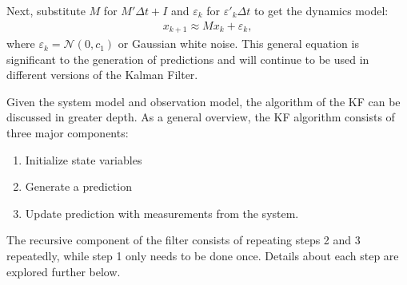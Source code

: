 {\noindent Next, substitute $M$ for $M' \Delta t + I$ and $\varepsilon_k$ for  $\varepsilon '_k  \Delta t $ to get the dynamics model:
\begin{align*}
	x_{k+1} \approx M x_k + \varepsilon_k,
\end{align*}
\noindent where $\varepsilon_k = \mathcal{N}(0, c_1)$ or Gaussian white noise. This general equation is significant to the generation of predictions and will continue to be used in different versions of the Kalman Filter. \\ 

}





\noindent Given the system model and observation model, the algorithm of the KF can be discussed in greater depth. As a general overview, the KF algorithm consists of three major components:
\begin{enumerate}
  \item Initialize state variables
  \item Generate a prediction
  \item Update prediction with measurements from the system.
\end{enumerate}
The recursive component of the filter consists of repeating steps 2 and 3 repeatedly, while step 1 only needs to be done once. Details about each step are explored further below. \\


